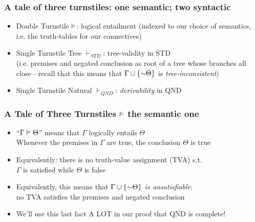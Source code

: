 \begin{frame}
\frametitle{A tale of three turnstiles: one semantic; two syntactic}

\begin{itemize}[<+->]

\item Double Turnstile $\vDash$: logical entailment (indexed to our choice of semantics, i.e. the truth-tables for our connectives)

\item Single Turnstile Tree $\vdash_{STD}$: tree-validity in STD \\ (i.e. premises and negated conclusion as root of a tree whose branches all close---recall that this means that $\Gamma \cup \{\enot \Theta\}$ is \emph{tree-inconsistent}) %

\item Single Turnstile Natural $\vdash_{QND}$: \emph{derivability} in QND

\end{itemize}
\end{frame}

\begin{frame}
\frametitle{A Tale of Three Turnstiles $\vDash$ the semantic one}

\begin{itemize}[<+->]


\item ``$\Gamma \vDash \Theta$'' means that $\Gamma$ logically entails $\Theta$ \\ Whenever the premises in $\Gamma$ are true, the conclusion $\Theta$ is true 

\item Equivalently: there is no truth-value assignment (TVA) s.t. \\ $\Gamma$ is satisfied while $\Theta$ is false

\item Equivalently, this means that \emph{$\Gamma \cup \{\enot \Theta\}$ is unsatisfiable}: \\ no TVA satisfies the premises and negated conclusion  

\item We'll use this last fact A LOT in our proof that QND is complete! %

\end{itemize}
\end{frame}


